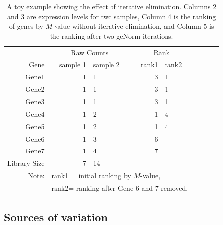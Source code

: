 \documentclass[letterpaper,12pt]{article}
\begin{document}
 
\begin{table}[ht] \centering \caption{A toy example showing the effect of iterative elimination. Columns 2 and 3 are expression levels for two samples, Column 4 is the ranking of genes by $M$-value without iterative elimination, and Column 5 is the ranking after two geNorm iterations.} 
	\begin{tabular}{rrp{2cm}rp{2cm}rp{2cm}rp{2cm}}
    \hline & \multicolumn{2}{c}{Raw Counts} & \multicolumn{2}{c}{Rank}\\
     Gene & sample 1 & sample 2 & rank1 & rank2 \\ \hline 
    Gene1 & 1 & 1 & 3 & 1 \\ 
    Gene2 & 1 & 1 & 3 & 1 \\ 
    Gene3 & 1 & 1 & 3 & 1 \\
     Gene4 & 1 & 2 & 1 & 4 \\ 
     Gene5 & 1 & 2 & 1 & 4 \\ 
     Gene6 & 1 & 3 & 6 &  \\ 
    Gene7 & 1 & 4 & 7 &  \\ \hline 
    Library Size & 7 & 14 & & 	\\ \hline 
    Note: &\multicolumn{4}{l}{ rank1 = initial ranking by $M$-value, } \\
    & \multicolumn{4}{l}{ rank2= ranking after Gene 6 and 7 removed.}
\end{tabular} \label{table:toyexample} \end{table}







\subsection{Sources of variation}\label{Section:varianceComp}
\end{document}
